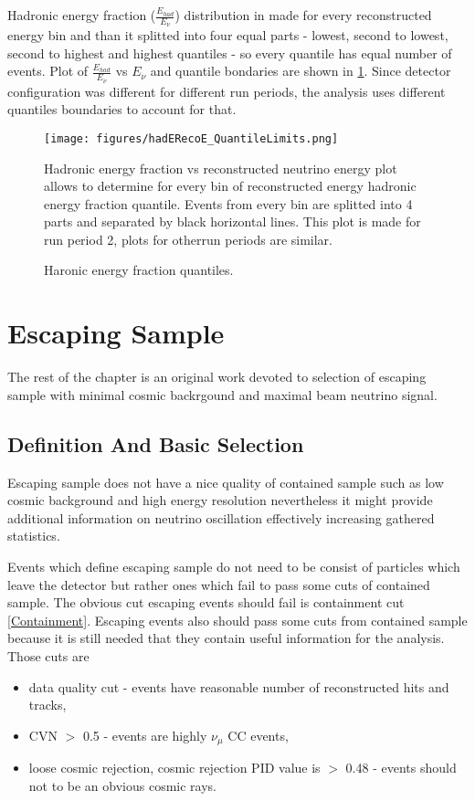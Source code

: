 Hadronic energy fraction ($\frac{E_{had}}{E_\nu}$) distribution in made for every reconstructed energy
bin and than it splitted into four equal parts - lowest, second to lowest, second to highest and highest
quantiles - so every quantile has equal number of events. Plot of $\frac{E_{had}}{E_\nu}$ vs $E_\nu$ and 
quantile bondaries are shown in \ref{fig:hadE_Quant}. Since detector configuration was different for 
different run periods, the analysis uses different quantiles boundaries to account for that. 
\begin{figure}[h]
\centering
\texttt{[image: figures/hadERecoE\_QuantileLimits.png]}
\caption{Haronic energy fraction quantiles.}
{Hadronic energy fraction vs reconstructed neutrino energy plot allows to determine for every bin of
reconstructed energy hadronic energy fraction quantile. Events from every bin are splitted into 4 parts
and separated by black horizontal lines. This plot is made for run period 2, plots for otherrun periods 
are similar.}
\label{fig:hadE_Quant}
\end{figure}

\section{Escaping Sample}
The rest of the chapter is an original work devoted to selection of escaping sample with minimal
cosmic backrgound and maximal beam neutrino signal.

\subsection{Definition And Basic Selection} \label{base_cut}
Escaping sample does not have a nice quality of contained sample such as low cosmic background and
high energy resolution nevertheless it might provide additional information on neutrino oscillation
effectively increasing gathered statistics. 

Events which define escaping sample do not need to be consist of particles which leave the detector but
rather ones which fail to pass some cuts of contained sample. The obvious cut escaping events should 
fail is containment cut \ref{Containment}. Escaping events also should pass some cuts from contained 
sample because it is still needed that they contain useful information for the analysis. Those cuts are
\begin{itemize}
\item data quality cut - events have reasonable number of reconstructed hits and tracks,
\item CVN $>$ 0.5 - events are highly $\nu_\mu$ CC events,
\item loose cosmic rejection, cosmic rejection PID value is $>$ 0.48 - events should not to be an obvious 
cosmic rays.
\end{itemize}

